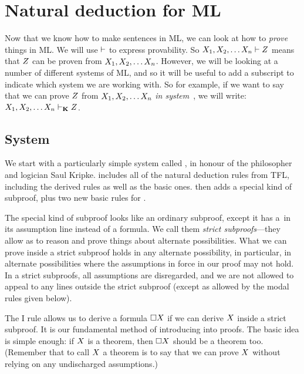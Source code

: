 \chapter{Natural deduction for ML}
\label{Proof}

Now that we know how to make sentences in ML, we can look at how to \emph{prove} things in ML. We will use $\vdash$ to express provability.  So $X_1,X_2, \dots X_n \vdash Z$ means that $Z$ can be proven from $X_1,X_2, \dots X_n$. However, we will be looking at a number of different systems of ML, and so it will be useful to add a subscript to indicate which system we are working with. So for example, if we want to say that we can prove $Z$ from $X_1,X_2, \dots X_n$ \emph{in system}~\mlK, we will write: $X_1,X_2, \dots X_n \vdash_{\mathbf{K}} Z$.

\section{System \mlK}
\label{K}

We start with a particularly simple system called \mlK, in honour of the philosopher and logician Saul Kripke. \mlK{} includes all of the natural deduction rules from TFL, including the derived rules as well as the basic ones. \mlK{} then adds a special kind of subproof, plus two new basic rules for \ebox.

The special kind of subproof looks like an ordinary subproof, except it has a~\ebox in its assumption line instead of a formula. We call them \emph{strict subproofs}---they allow as to reason and prove things about alternate possibilities. What we can prove inside a strict subproof holds in any alternate possibility, in particular, in alternate possibilities where the assumptions in force in our proof may not hold. In a strict subproofs, all assumptions are disregarded, and we are not allowed to appeal to any lines outside the strict subproof (except as allowed by the modal rules given below).

The \ebox I rule allows us to derive a formula $\Box X$ if we can derive $X$ inside a strict subproof.  It is our fundamental method of introducing \ebox{} into proofs. The basic idea is simple enough: if $X$ is a theorem, then $\Box X$ should be a theorem too. (Remember that to call $X$ a theorem is to say that we can prove $X$ without relying on any undischarged assumptions.)


